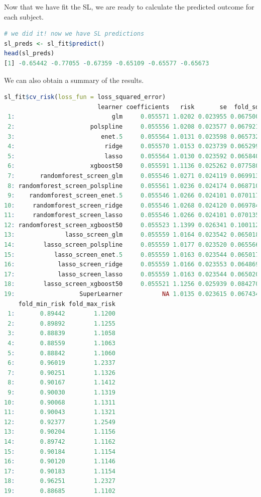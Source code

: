 \documentclass[
  12pt, krantz2,
]{krantz}
\newcommand{\1}{\mathbbm{1}}
\theoremstyle{definition}
\theoremstyle{definition}
\theoremstyle{definition}
\theoremstyle{definition}
\theoremstyle{remark}
\begin{document}
Now that we have fit the SL, we are ready to calculate the predicted outcome
for each subject.

\begin{lstlisting}[language=R]
# we did it! now we have SL predictions
sl_preds <- sl_fit$predict()
head(sl_preds)
[1] -0.65442 -0.77055 -0.67359 -0.65109 -0.65577 -0.65673
\end{lstlisting}

We can also obtain a summary of the results.

\begin{lstlisting}[language=R]
sl_fit$cv_risk(loss_fun = loss_squared_error)
                          learner coefficients   risk       se  fold_sd
 1:                           glm     0.055571 1.0202 0.023955 0.067500
 2:                     polspline     0.055556 1.0208 0.023577 0.067921
 3:                        enet.5     0.055564 1.0131 0.023598 0.065732
 4:                         ridge     0.055570 1.0153 0.023739 0.065299
 5:                         lasso     0.055564 1.0130 0.023592 0.065840
 6:                     xgboost50     0.055591 1.1136 0.025262 0.077580
 7:       randomforest_screen_glm     0.055546 1.0271 0.024119 0.069913
 8: randomforest_screen_polspline     0.055561 1.0236 0.024174 0.068710
 9:    randomforest_screen_enet.5     0.055546 1.0266 0.024101 0.070117
10:     randomforest_screen_ridge     0.055546 1.0268 0.024120 0.069784
11:     randomforest_screen_lasso     0.055546 1.0266 0.024101 0.070135
12: randomforest_screen_xgboost50     0.055523 1.1399 0.026341 0.100112
13:              lasso_screen_glm     0.055559 1.0164 0.023542 0.065018
14:        lasso_screen_polspline     0.055559 1.0177 0.023520 0.065566
15:           lasso_screen_enet.5     0.055559 1.0163 0.023544 0.065017
16:            lasso_screen_ridge     0.055559 1.0166 0.023553 0.064869
17:            lasso_screen_lasso     0.055559 1.0163 0.023544 0.065020
18:        lasso_screen_xgboost50     0.055521 1.1256 0.025939 0.084270
19:                  SuperLearner           NA 1.0135 0.023615 0.067434
    fold_min_risk fold_max_risk
 1:       0.89442        1.1200
 2:       0.89892        1.1255
 3:       0.88839        1.1058
 4:       0.88559        1.1063
 5:       0.88842        1.1060
 6:       0.96019        1.2337
 7:       0.90251        1.1326
 8:       0.90167        1.1412
 9:       0.90030        1.1319
10:       0.90068        1.1311
11:       0.90043        1.1321
12:       0.92377        1.2549
13:       0.90204        1.1156
14:       0.89742        1.1162
15:       0.90184        1.1154
16:       0.90120        1.1146
17:       0.90183        1.1154
18:       0.96251        1.2327
19:       0.88685        1.1102
\end{lstlisting}
\end{document}
